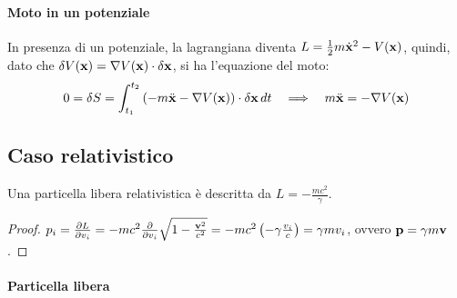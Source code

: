 \paragraph{Moto in un potenziale}

In presenza di un potenziale, la lagrangiana diventa $ L = \frac{1}{2} m \dot{\mathbf{x}}^2 - V(\mathbf{x}) $, quindi, dato che $ \delta V(\mathbf{x}) = \nabla V(\mathbf{x}) \cdot \delta\mathbf{x} $, si ha l'equazione del moto:
\begin{equation}
	0 = \delta S = \int_{t_1}^{t_2} \left( - m\ddot{\mathbf{x}} - \nabla V(\mathbf{x}) \right) \cdot \delta\mathbf{x} \,dt \quad\Longrightarrow\quad m\ddot{\mathbf{x}} = - \nabla V(\mathbf{x})
	\label{eq:5.4}
\end{equation}

\subsection{Caso relativistico}

\begin{proposition}
	Una particella libera relativistica è descritta da $ L = - \frac{m c^2}{\gamma} $.
\end{proposition}
\begin{proof}
	$ p_i = \frac{\partial L}{\partial v_i} = - mc^2 \frac{\partial}{\partial v_i} \sqrt{1 - \frac{\mathbf{v}^2}{c^2}} = -mc^2 \left( -  \gamma \frac{v_i}{c} \right) = \gamma m v_i $, ovvero $ \mathbf{p} = \gamma m \mathbf{v} $.
\end{proof}

\paragraph{Particella libera}

